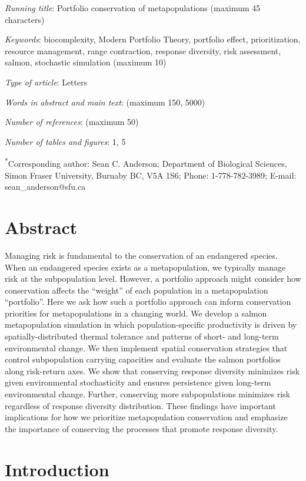 \emph{Running title}: Portfolio conservation of metapopulations (maximum 45 characters)

\emph{Keywords}: biocomplexity, Modern Portfolio Theory, portfolio effect, prioritization, resource management, range contraction, response diversity, risk assessment, salmon, stochastic simulation (maximum 10)

\emph{Type of article}: Letters

\emph{Words in abstract and main text}: (maximum 150, 5000)

\emph{Number of references}: (maximum 50)

\emph{Number of tables and figures}: 1, 5

\textsuperscript{*}Corresponding author: Sean C. Anderson; Department of Biological Sciences, Simon Fraser University, Burnaby BC, V5A 1S6; Phone: 1-778-782-3989; E-mail: sean\_anderson@sfu.ca

\section{Abstract}

Managing risk is fundamental to the conservation of an endangered species. When an endangered species exists as a metapopulation, we typically manage risk at the subpopulation level. However, a portfolio approach might consider how conservation affects the ``weight'' of each population in a metapopulation ``portfolio''. Here we ask how such a portfolio approach can inform conservation priorities for metapopulations in a changing world. We develop a salmon metapopulation simulation in which population-specific productivity is driven by spatially-distributed thermal tolerance and patterns of short- and long-term environmental change. We then implement spatial conservation strategies that control subpopulation carrying capacities and evaluate the salmon portfolios along risk-return axes. We show that conserving response diversity minimizes risk given environmental stochasticity and ensures persistence given long-term environmental change. Further, conserving more subpopulations minimizes risk regardless of response diversity distribution. These findings have important implications for how we prioritize metapopulation conservation and emphasize the importance of conserving the processes that promote response diversity.

\section{Introduction}

